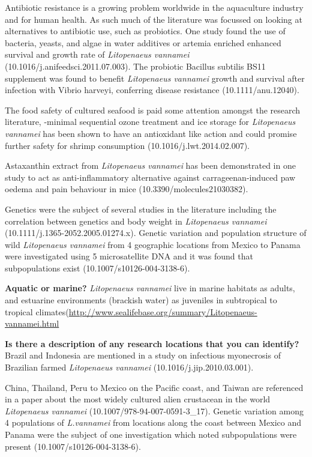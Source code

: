 \documentclass[]{book}
\theoremstyle{definition}
\theoremstyle{definition}
\theoremstyle{definition}
\theoremstyle{remark}
\begin{document}
Antibiotic resistance is a growing problem worldwide in the aquaculture
industry and for human health. As such much of the literature was
focussed on looking at alternatives to antibiotic use, such as
probiotics. One study found the use of bacteria, yeasts, and algae in
water additives or artemia enriched enhanced survival and growth rate of
\emph{Litopenaeus vannamei} (10.1016/j.anifeedsci.2011.07.003). The
probiotic Bacillus subtilis BS11 supplement was found to benefit
\emph{Litopenaeus vannamei} growth and survival after infection with
Vibrio harveyi, conferring disease resistance (10.1111/anu.12040).

The food safety of cultured seafood is paid some attention amongst the
research literature, -minimal sequential ozone treatment and ice storage
for \emph{Litopenaeus vannamei} has been shown to have an antioxidant
like action and could promise further safety for shrimp consumption
(10.1016/j.lwt.2014.02.007).

Astaxanthin extract from \emph{Litopenaeus vannamei} has been
demonstrated in one study to act as anti-inflammatory alternative
against carrageenan-induced paw oedema and pain behaviour in mice
(10.3390/molecules21030382).

Genetics were the subject of several studies in the literature including
the correlation between genetics and body weight in \emph{Litopenaeus
vannamei} (10.1111/j.1365-2052.2005.01274.x). Genetic variation and
population structure of wild \emph{Litopenaeus vannamei} from 4
geographic locations from Mexico to Panama were investigated using 5
microsatellite DNA and it was found that subpopulations exist
(10.1007/s10126-004-3138-6).

\textbf{Aquatic or marine?} \emph{Litopenaeus vannamei} live in marine
habitats as adults, and estuarine environments (brackish water) as
juveniles in subtropical to tropical
climates(\url{http://www.sealifebase.org/summary/Litopenaeus-vannamei.html}

\textbf{Is there a description of any research locations that you can
identify?}\\
Brazil and Indonesia are mentioned in a study on infectious myonecrosis
of Brazilian farmed \emph{Litopenaeus vannamei}
(10.1016/j.jip.2010.03.001).

China, Thailand, Peru to Mexico on the Pacific coast, and Taiwan are
referenced in a paper about the most widely cultured alien crustacean in
the world \emph{Litopenaeus vannamei} (10.1007/978-94-007-0591-3\_17).
Genetic variation among 4 populations of \emph{L.vannamei} from
locations along the coast between Mexico and Panama were the subject of
one investigation which noted subpopulations were present
(10.1007/s10126-004-3138-6).
\end{document}
